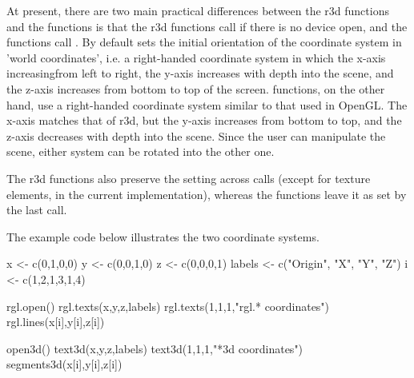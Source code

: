 \documentclass{article}
\begin{document}
\begin{Details}
At present, there are two main practical differences between the r3d functions
and the  functions is that the r3d functions call
 if there is no device open, and the
 functions call . By default
 sets the initial orientation of the coordinate
system in 'world coordinates', i.e. a right-handed coordinate system
in which the x-axis increasingfrom left to right, the y-axis
increases with depth into the scene, and the z-axis increases from
bottom to top of the screen.   functions, on the other
hand, use a right-handed coordinate system similar to that used in
OpenGL.  The x-axis matches that of r3d, but the y-axis increases
from bottom to top, and the z-axis decreases with depth into the
scene.  Since the user can manipulate the scene, either system can
be rotated into the other one.  

The r3d functions also preserve the  setting across
calls (except for texture elements, in the current implementation), whereas
the  functions leave it as set by the last call.

The example code below illustrates the two coordinate systems.
\end{Details}
\begin{SeeAlso}\relax
{}
\end{SeeAlso}
\begin{Examples}
\begin{ExampleCode}
    
     x <- c(0,1,0,0)
     y <- c(0,0,1,0)
     z <- c(0,0,0,1)
     labels <- c("Origin", "X", "Y", "Z")
     i <- c(1,2,1,3,1,4)

     rgl.open()
     rgl.texts(x,y,z,labels)
     rgl.texts(1,1,1,"rgl.* coordinates")
     rgl.lines(x[i],y[i],z[i])

     open3d()
     text3d(x,y,z,labels)
     text3d(1,1,1,"*3d coordinates")
     segments3d(x[i],y[i],z[i])
\end{ExampleCode}
\end{Examples}
\end{document}
